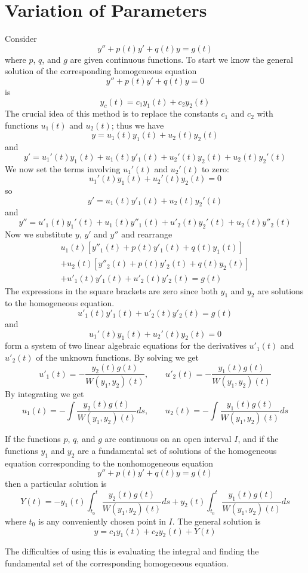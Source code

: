 \section{Variation of Parameters}
    Consider
    \begin{equation*}
        y'' + p(t)y' + q(t)y = g(t) 
    \end{equation*}
    where $p$, $q$, and $g$ are given continuous functions. To start we know the general solution of the corresponding homogeneous equation
    \begin{equation*}
        y'' + p(t)y' + q(t)y = 0
    \end{equation*}
    is
    \begin{equation*}
        y_c(t) = c_1y_1(t) + c_2y_2(t)
    \end{equation*}
    The crucial idea of this method is to replace the constants $c_1$ and $c_2$ with functions $u_1(t)$ and $u_2(t)$; thus we have
    $$y=u_1(t)y_1(t) + u_2(t)y_2(t)$$
    and
    $$y' = u_1'(t)y_1(t) + u_1(t)y'_1(t) + u_2'(t)y_2(t) + u_2(t)y_2'(t)$$
    We now set the terms involving $u_1'(t)$ and $u_2'(t)$ to zero:
    $$u_1'(t)y_1(t) + u_2'(t)y_2(t) = 0$$
    so
    $$y' = u_1(t)y'_1(t) + u_2(t)y_2'(t)$$
    and
    $$y'' = u'_1(t)y_1'(t) + u_1(t)y''_1(t) + u'_2(t)y_2'(t) + u_2(t)y''_2(t)$$
    Now we substitute $y$, $y'$ and $y''$ and rearrange
    \begin{align*}
        u_1(t)[y''_1(t) + p(t)y'_1(t) + q(t)y_1(t)] \\
        + u_2(t)[y''_2(t) + p(t)y'_2(t) + q(t)y_2(t)] \\
        + u'_1(t)y'_1(t) + u'_2(t)y'_2(t) = g(t)
    \end{align*}
    The expressions in the square brackets are zero since both $y_1$ and $y_2$ are solutions to the homogeneous equation.
    $$u'_1(t)y'_1(t) + u'_2(t)y'_2(t) = g(t)$$
    and
    $$u_1'(t)y_1(t) + u_2'(t)y_2(t) = 0$$
    form a system of two linear algebraic equations for the derivatives $u'_1(t)$ and $u'_2(t)$ of the unknown functions. By solving we get
    $$u'_1(t) = -\frac{y_2(t)g(t)}{W(y_1, y_2)(t)}, \qquad u'_2(t) = -\frac{y_1(t)g(t)}{W(y_1, y_2)(t)}$$
    By integrating we get
    $$u_1(t) = -\int\frac{y_2(t)g(t)}{W(y_1, y_2)(t)}ds, \qquad u_2(t) = -\int\frac{y_1(t)g(t)}{W(y_1, y_2)(t)}ds$$
    \begin{theorem}
        If the functions $p$, $q$, and $g$ are continuous on an open interval $I$, and if the functions $y_1$ and $y_2$ are a fundamental set of solutions of the homogeneous equation corresponding to the nonhomogeneous equation
        $$y'' + p(t)y' + q(t)y = g(t)$$
        then a particular solution is
        $$Y(t) = -y_1(t)\int_{t_0}^t\frac{y_2(t)g(t)}{W(y_1, y_2)(t)}ds + y_2(t)\int_{t_0}^t\frac{y_1(t)g(t)}{W(y_1, y_2)(t)}ds$$
        where $t_0$ is any conveniently chosen point in $I$. The general solution is 
        $$y = c_1y_1(t) + c_2y_2(t) + Y(t)$$
    \end{theorem}
    The difficulties of using this is evaluating the integral and finding the fundamental set of the corresponding homogeneous equation.